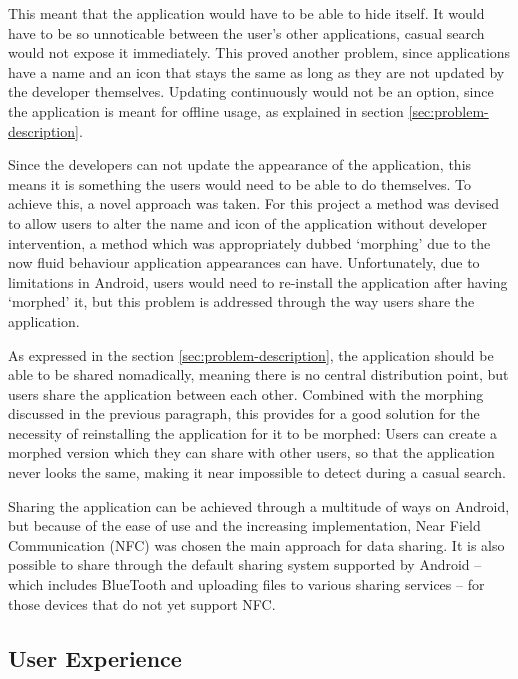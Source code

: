 This meant that the application would have to be able to hide itself.
It would have to be so unnoticable between the user's other applications, casual search would not expose it immediately. 
This proved another problem, since applications have a name and an icon that stays the same as long as they are not updated by the developer themselves. 
Updating continuously would not be an option, since the application is meant for offline usage, as explained in section \ref{sec:problem-description}. 

Since the developers can not update the appearance of the application, this means it is something the users would need to be able to do themselves.
To achieve this, a novel approach was taken.
For this project a method was devised to allow users to alter the name and icon of the application without developer intervention, a method which was appropriately dubbed `morphing' due to the now fluid behaviour application appearances can have.
Unfortunately, due to limitations in Android, users would need to re-install the application after having `morphed' it, but this problem is addressed through the way users share the application.

As expressed in the section \ref{sec:problem-description}, the application should be able to be shared nomadically, meaning there is no central distribution point, but users share the application between each other. 
Combined with the morphing discussed in the previous paragraph, this provides for a good solution for the necessity of reinstalling the application for it to be morphed: 
Users can create a morphed version which they can share with other users, so that the application never looks the same, making it near impossible to detect during a casual search.

Sharing the application can be achieved through a multitude of ways on Android, but because of the ease of use and the increasing implementation, Near Field Communication (NFC)\cite{website:nfc-spec} was chosen the main approach for data sharing. 
It is also possible to share through the default sharing system supported by Android -- which includes BlueTooth and uploading files to various sharing services -- for those devices that do not yet support NFC.

\subsection{User Experience}
\label{sec:approach-and-design:user-experience}

